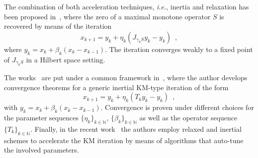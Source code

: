 \documentclass[envcountsect]{svjour3}
\newcommand{\ie}{{\it i.e.}}
\newcommand{\Hil}{{\mathcal{H} }}
\newcommand{\N}{{\mathbb{N} }}
\newcommand{\prox}{\operatorname{\bf prox}}
\begin{document}
The combination of both acceleration techniques, \ie, inertia and relaxation has been proposed in~\cite{Alvarez:2004:WCR}, where the zero of a maximal monotone operator $S$ is recovered by means of the iteration
\begin{equation*}
 x_{k+1} = y_k + \eta_k (J_{\gamma_k S}y_k - y_k)\enspace,
\end{equation*}
where $y_k=x_k + \beta_k(x_k-x_{k-1})$. The iteration converges weakly to a fixed point of $J_{\gamma_k S}$ in a Hilbert space setting.

The works~\cite{AlvarezAttouch2001,Moudafi2003447,Alvarez:2004:WCR} are put under a common framework in~\cite{Maingé2008223}, where the author develops convergence theorems for a generic inertial KM-type iteration of the form
\begin{equation*}
 x_{k+1} = y_k + \eta_k (T_ky_k-y_k)\enspace,
\end{equation*}
with $y_k=x_k + \beta_k(x_k-x_{k-1})$. Convergence is proven under different choices for the parameter sequences $\{\eta_k\}_{k\in\N}$, $\{\beta_k\}_{k\in\N}$ as well as the operator sequence $\{T_k\}_{k\in\N}$.
Finally, in the recent work~\cite{hendrickx} the authors employ relaxed and inertial schemes to accelerate the KM iteration by means of algorithms that auto-tune the involved parameters.


\end{document}
